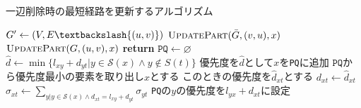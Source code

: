 \begin{algorithm}[tbp]
  \caption{一辺削除時の最短経路を更新するアルゴリズム}
  \label{alg:decremental-algorithm}
  \begin{multicols}{2}
    \begin{algorithmic}[1]\small
      \State $G'\gets (V,E\textbackslash\{(u,v)\})$
      \State $\textproc{UpdatePart}(\bar{G},(v,u),x)$
      \EndFor
      \State $\textproc{UpdatePart}(G,(u,v),x)$
      \EndFor
      \EndProcedure
      \vfill\null
      \columnbreak
      \State \textbf{return}
      \EndIf
      \State $\texttt{PQ}\gets\varnothing$
      \State $\hat{d}\gets\min\{l_{xy}+d_{yt}|y\in\mathcal{S}(x)\land y\notin S(t)\}$
      \State 優先度を$\hat{d}$として$x$を\texttt{PQ}に追加
      \EndIf
      \EndFor
      \State $\texttt{PQ}$から優先度最小の要素を取り出し$x$とする
      \State このときの優先度を$\hat{d}_{xt}$とする
      \State $d_{xt}\gets\hat{d}_{xt}$
      \State $\sigma_{xt}\gets\sum_{y|y\in\mathcal{S}(x)\land d_{xt}=l_{xy}+d_{yt}}\sigma_{yt}$
      \State \texttt{PQ}の$y$の優先度を$l_{yx}+d_{xt}$に設定
      \EndIf
      \EndFor
      \EndWhile
      \EndProcedure
    \end{algorithmic}
  \end{multicols}
\end{algorithm}
